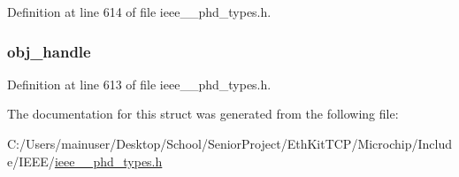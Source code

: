 Definition at line 614 of file ieee\+\_\+\_\+phd\+\_\+types.\+h.

\hypertarget{struct___set_argument_simple_abbfff52b7a4956021522f5750c4b32c6}{}
\subsubsection[{obj\+\_\+handle}]{ obj\+\_\+handle}\label{struct___set_argument_simple_abbfff52b7a4956021522f5750c4b32c6}


Definition at line 613 of file ieee\+\_\+\_\+phd\+\_\+types.\+h.



The documentation for this struct was generated from the following file\+:\begin{DoxyCompactItemize}
\item 
C\+:/\+Users/mainuser/\+Desktop/\+School/\+Senior\+Project/\+Eth\+Kit\+T\+C\+P/\+Microchip/\+Include/\+I\+E\+E\+E/\hyperlink{ieee__11073__phd__types_8h}{ieee\+\_\+\_\+phd\+\_\+types.\+h}\end{DoxyCompactItemize}
